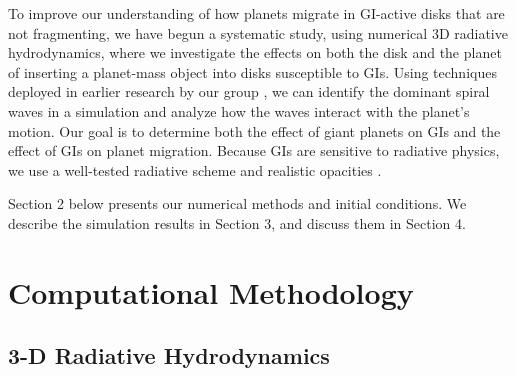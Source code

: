 \documentclass[12pt,manuscript,authoryear]{aastex}
\begin{document}
To improve our understanding of how planets migrate in GI-active disks that are not fragmenting, we have begun a systematic study, using numerical 3D radiative hydrodynamics, where we investigate the effects on both the disk and the planet of inserting a planet-mass object into disks susceptible to GIs. Using techniques deployed in earlier research by our group \citep{pickett2003, mejia2005,cai2006,cai2008,boley2006,boley2007b,michael2010}, we can identify the dominant spiral waves in a simulation and analyze how the waves interact with the planet's motion. Our goal is to determine both the effect of giant planets on GIs and the effect of GIs on planet migration. Because GIs are sensitive to radiative physics, we use a well-tested radiative scheme \citep{boley2007b} and realistic opacities \citep{dalessio2001}. 

Section 2 below presents our numerical methods and initial conditions.  We describe the simulation results in Section 3, and discuss them in Section 4.  

\section{Computational Methodology}

\subsection{3-D Radiative Hydrodynamics}
\end{document}
